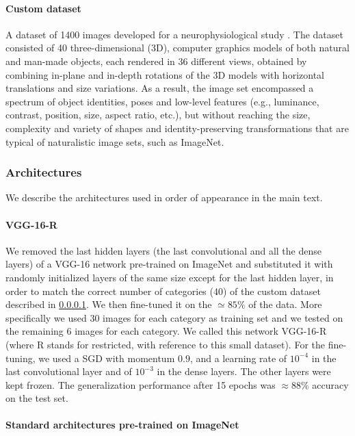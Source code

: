 \documentclass{article}
\begin{document}
\paragraph{Custom dataset}\label{custom_dataset}

A dataset of 1400 images developed for a neurophysiological study \cite{vascon2018characterization}. The dataset consisted of 40 three-dimensional (3D), computer graphics models of both natural and man-made objects, each rendered in 36 different views, obtained by combining in-plane and in-depth rotations of the 3D models with horizontal translations and size variations. As a result, the image set encompassed a spectrum of object identities, poses and low-level features (e.g., luminance, contrast, position, size, aspect ratio, etc.), but without reaching the size, complexity and variety of shapes and identity-preserving transformations that are typical of naturalistic image sets, such as ImageNet.

\subsubsection{Architectures}\label{architectures}

We describe the architectures used in order of appearance in the main text.
\paragraph{VGG-16-R}

We removed the last hidden layers (the last convolutional and all the dense layers) of a VGG-16 network \cite{simonyan2014very} pre-trained on ImageNet \cite{krizhevsky2012imagenet} and substituted it with randomly initialized layers of the same size except for the last hidden layer, in order to match the correct number of categories (40) of the custom dataset described in \ref{custom_dataset}.
We then fine-tuned it on the $\simeq 85 \%$ of the data.
More specifically we used $30$ images for each category as training set and we tested on the remaining $6$ images for each category. We called this network VGG-16-R (where R stands for restricted, with reference to this small dataset). For the fine-tuning, we used a SGD with momentum $0.9$, and a learning rate of $10^{-4}$ in the last convolutional layer and of $10^{-3}$ in the dense layers. The other layers were kept frozen. The generalization performance after 15 epochs was $\approx 88 \%$ accuracy on the test set.

\paragraph{Standard architectures pre-trained on ImageNet}
\end{document}
